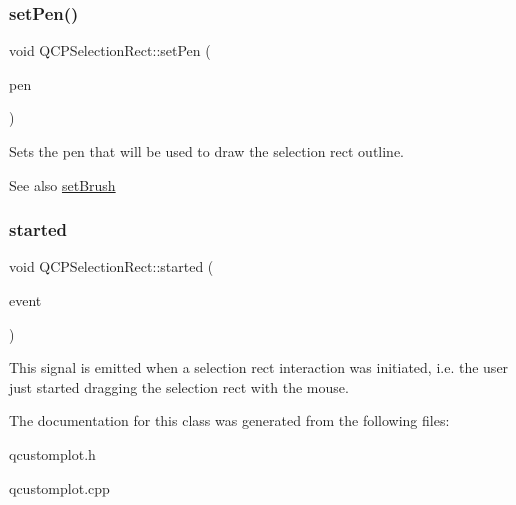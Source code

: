 \subsubsection{\texorpdfstring{set\+Pen()}{setPen()}}
{\footnotesize\ttfamily void Q\+C\+P\+Selection\+Rect\+::set\+Pen (\begin{DoxyParamCaption}\item[{const Q\+Pen \&}]{pen }\end{DoxyParamCaption})}

Sets the pen that will be used to draw the selection rect outline.

\begin{DoxySeeAlso}{See also}
\hyperlink{class_q_c_p_selection_rect_ab0c66f1484418782efa01f4153611080}{set\+Brush} 
\end{DoxySeeAlso}
\mbox{\label{class_q_c_p_selection_rect_a7b7162d19f4f2174d3644ff1a5d335aa}} 
\subsubsection{\texorpdfstring{started}{started}}
{\footnotesize\ttfamily void Q\+C\+P\+Selection\+Rect\+::started (\begin{DoxyParamCaption}\item[{Q\+Mouse\+Event $\ast$}]{event }\end{DoxyParamCaption})\hspace{0.3cm}{\ttfamily [signal]}}

This signal is emitted when a selection rect interaction was initiated, i.\+e. the user just started dragging the selection rect with the mouse. 

The documentation for this class was generated from the following files\+:\begin{DoxyCompactItemize}
\item 
qcustomplot.\+h\item 
qcustomplot.\+cpp\end{DoxyCompactItemize}
